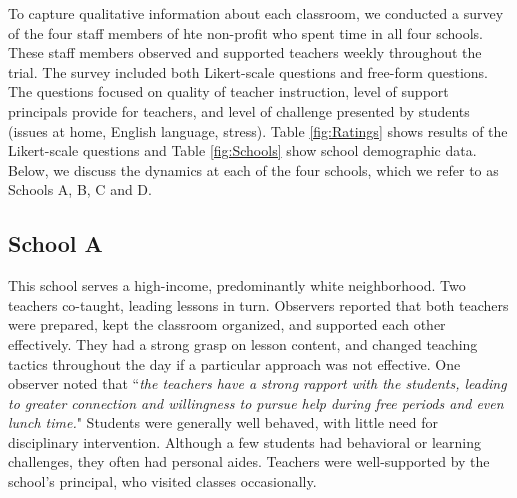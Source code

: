 \documentclass{sigchi}
\begin{document}
To capture qualitative information about each classroom, we conducted a survey of the four staff members of hte non-profit who spent time in all four schools. These staff members observed and supported teachers weekly throughout the trial. The survey included both Likert-scale questions and free-form questions. The questions focused on quality of teacher instruction, level of support principals provide for teachers, and level of challenge presented by students (issues at home, English language, stress). Table \ref{fig:Ratings} shows results of the Likert-scale questions and Table \ref{fig:Schools} show school demographic data. Below, we discuss the dynamics at each of the four schools, which we refer to as Schools A, B, C and D.


\subsection{School A}
This school serves a high-income, predominantly white neighborhood. Two teachers co-taught, leading lessons in turn. Observers reported that both teachers were prepared, kept the classroom organized, and supported each other effectively. They had a strong grasp on lesson content, and changed teaching tactics throughout the day if a particular approach was not effective. One observer noted that ``\emph{the teachers have a strong rapport with the students, leading to greater connection and willingness to pursue help during free periods and even lunch time.}" Students were generally well behaved, with little need for disciplinary intervention. Although a few students had behavioral or learning challenges, they often had personal aides. Teachers were well-supported by the school's principal, who visited classes occasionally.
\end{document}
